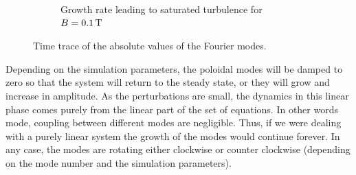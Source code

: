 \begin{figure}
\begin{subfigure}[h]{1\textwidth}
        \label{fig:fourierUnstable}
        \caption{Growth rate leading to saturated turbulence for $B=0.1\, \text{T}$}
    \end{subfigure}
    \caption{Time trace of the absolute values of the Fourier modes.}
    \label{fig:fourierDens}
\end{figure}
%

Depending on the simulation parameters, the poloidal modes will be damped to zero so that the system will return to the steady state, or they will grow and increase in amplitude.
As the perturbations are small, the dynamics in this linear phase comes purely from the linear part of the set of equations.
In other words mode, coupling between different modes are negligible.
Thus, if we were dealing with a purely linear system the growth of the modes would continue forever.
In any case, the modes are rotating either clockwise or counter clockwise (depending on the mode number and the simulation parameters).

